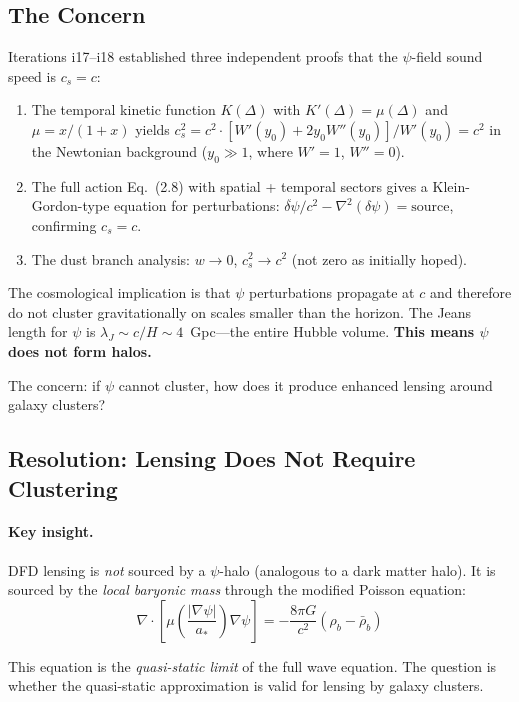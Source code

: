 \documentclass[11pt,a4paper]{article}
\newcommand{\astar}{a_*}
\begin{document}
\subsection{The Concern}

Iterations i17--i18 established three independent proofs that the
$\psi$-field sound speed is $c_s = c$:
\begin{enumerate}[label=(\roman*)]
\item The temporal kinetic function $K(\Delta)$ with $K'(\Delta) = \mu(\Delta)$
  and $\mu = x/(1+x)$ yields $c_s^2 = c^2 \cdot [W'(y_0) + 2y_0 W''(y_0)]/W'(y_0)
  = c^2$ in the Newtonian background ($y_0 \gg 1$, where $W' = 1$, $W'' = 0$).
\item The full action Eq.~(2.8) with spatial + temporal sectors gives a
  Klein-Gordon-type equation for perturbations: $\ddot{\delta\psi}/c^2
  - \nabla^2(\delta\psi) = \text{source}$, confirming $c_s = c$.
\item The dust branch analysis: $w \to 0$, $c_s^2 \to c^2$ (not zero as
  initially hoped).
\end{enumerate}

The cosmological implication is that $\psi$ perturbations propagate at $c$
and therefore do not cluster gravitationally on scales smaller than the
horizon.  The Jeans length for $\psi$ is $\lambda_J \sim c/H \sim 4$~Gpc---the
entire Hubble volume.  \textbf{This means $\psi$ does not form halos.}

The concern: if $\psi$ cannot cluster, how does it produce enhanced lensing
around galaxy clusters?

\subsection{Resolution: Lensing Does Not Require Clustering}

\paragraph{Key insight.}
DFD lensing is \emph{not} sourced by a $\psi$-halo (analogous to a dark matter
halo).  It is sourced by the \emph{local baryonic mass} through the modified
Poisson equation:
\begin{equation}
\nabla \cdot \left[\mu\!\left(\frac{|\nabla\psi|}{\astar}\right)
\nabla\psi\right] = -\frac{8\pi G}{c^2}(\rho_b - \bar{\rho}_b)
\label{eq:modified-poisson}
\end{equation}

This equation is the \emph{quasi-static limit} of the full wave equation.
The question is whether the quasi-static approximation is valid for lensing
by galaxy clusters.
\end{document}
